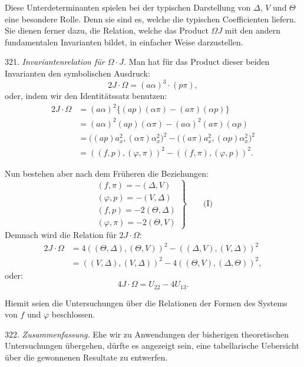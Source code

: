 Diese Unterdeterminanten spielen bei der typischen Darstellung von
$\Delta$, $V$ und $\Theta$ eine besondere Rolle. Denn sie sind es, welche
die typischen Coefficienten liefern. Sie dienen ferner dazu, die
Relation, welche das Product $\Omega J$ mit den andern fundamentalen
Invarianten bildet, in einfacher Weise darzustellen.



321. \textit{Invariantenrelation für $\Omega\cdot J$.} Man hat für das
Product dieser beiden Invarianten den symbolischen Ausdruck:
\[
2J\cdot\Omega=(a\alpha)^3\cdot(p\pi),
\]
oder, indem wir den Identitätssatz benutzen:
\[
\begin{aligned}
2J\cdot\Omega&=(a\alpha)^2\{(ap)(\alpha\pi)-(a\pi)(\alpha p)\}\\
&=(a\alpha)^2(ap)(\alpha\pi)-(a\alpha)^2(a\pi)(\alpha p)\\
&=\mathbf{(}(ap)a_x^2,(\alpha\pi)\alpha_x^2\mathbf{)}^2-\mathbf{(}(a\pi)a_x^2,(\alpha p)\alpha_x^2\mathbf{)}^2\\
&=((f,p),(\varphi,\pi))^2-((f,\pi),(\varphi,p))^2.
\end{aligned}
\]

Nun bestehen aber nach dem Früheren die Beziehungen:
\[
\left.\begin{array}{l}
(f,\pi)=-(\Delta,V)\\
(\varphi,p)=-(V,\Delta)\\
(f,p)=-2(\Theta,\Delta)\\
(\varphi,\pi)=-2(\Theta,V)
\end{array}\right\}\qquad\text{(I)}
\]
Demnach wird die Relation für $2J\cdot\Omega$:
\[
\begin{aligned}
2J\cdot\Omega&=4((\Theta,\Delta),(\Theta,V))^2-((\Delta,V),(V,\Delta))^2\\
&=((V,\Delta),(V,\Delta))^2-4((\Theta,V),(\Delta,\Theta))^2,
\end{aligned}
\]
oder:
\[
4J\cdot\Omega=U_{22}-4U_{13}.
\]

Hiemit seien die Untersuchungen über die Relationen der Formen des
Systems von $f$ und $\varphi$ beschlossen.

322. \textit{Zusammenfassung.} Ehe wir zu Anwendungen der bisherigen
theoretischen Untersuchungen übergehen, dürfte es angezeigt sein, eine
tabellarische Uebersicht über die gewonnenen Resultate zu entwerfen.

